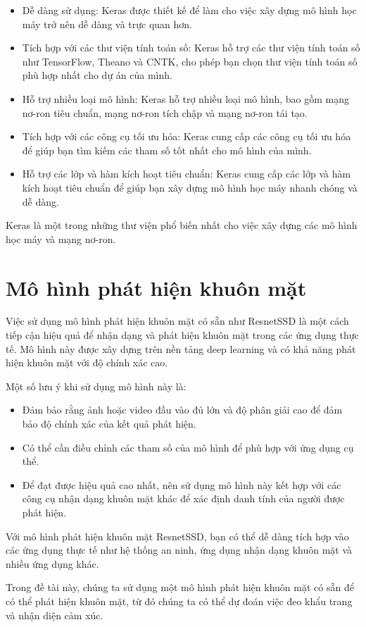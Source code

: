 \begin{itemize}
	\item Dễ dàng sử dụng: Keras được thiết kế để làm cho việc xây dựng mô hình học máy trở nên dễ dàng và trực quan hơn.
	
	\item Tích hợp với các thư viện tính toán số: Keras hỗ trợ các thư viện tính toán số như TensorFlow, Theano và CNTK, cho phép bạn chọn thư viện tính toán số phù hợp nhất cho dự án của mình.
	
	\item Hỗ trợ nhiều loại mô hình: Keras hỗ trợ nhiều loại mô hình, bao gồm mạng nơ-ron tiêu chuẩn, mạng nơ-ron tích chập và mạng nơ-ron tái tạo.
	
	\item Tích hợp với các công cụ tối ưu hóa: Keras cung cấp các công cụ tối ưu hóa để giúp bạn tìm kiếm các tham số tốt nhất cho mô hình của mình.
	
	\item Hỗ trợ các lớp và hàm kích hoạt tiêu chuẩn: Keras cung cấp các lớp và hàm kích hoạt tiêu chuẩn để giúp bạn xây dựng mô hình học máy nhanh chóng và dễ dàng.
\end{itemize}

Keras là một trong những thư viện phổ biến nhất cho việc xây dựng các mô hình học máy và mạng nơ-ron. 

\section{Mô hình phát hiện khuôn mặt}

Việc sử dụng mô hình phát hiện khuôn mặt có sẵn như ResnetSSD là một cách tiếp cận hiệu quả để nhận dạng và phát hiện khuôn mặt trong các ứng dụng thực tế. Mô hình này được xây dựng trên nền tảng deep learning và có khả năng phát hiện khuôn mặt với độ chính xác cao.

Một số lưu ý khi sử dụng mô hình này là:

\begin{itemize}
	\item Đảm bảo rằng ảnh hoặc video đầu vào đủ lớn và độ phân giải cao để đảm bảo độ chính xác của kết quả phát hiện.
	
	\item Có thể cần điều chỉnh các tham số của mô hình để phù hợp với ứng dụng cụ thể.
	
	\item Để đạt được hiệu quả cao nhất, nên sử dụng mô hình này kết hợp với các công cụ nhận dạng khuôn mặt khác để xác định danh tính của người được phát hiện.
\end{itemize}

Với mô hình phát hiện khuôn mặt ResnetSSD, bạn có thể dễ dàng tích hợp vào các ứng dụng thực tế như hệ thống an ninh, ứng dụng nhận dạng khuôn mặt và nhiều ứng dụng khác.

Trong đề tài này, chúng ta sử dụng một mô hình phát hiện khuôn mặt có sẵn để có thể phát hiện khuôn mặt, từ đó chúng ta có thể dự đoán việc đeo khẩu trang và nhận diện cảm xúc.









